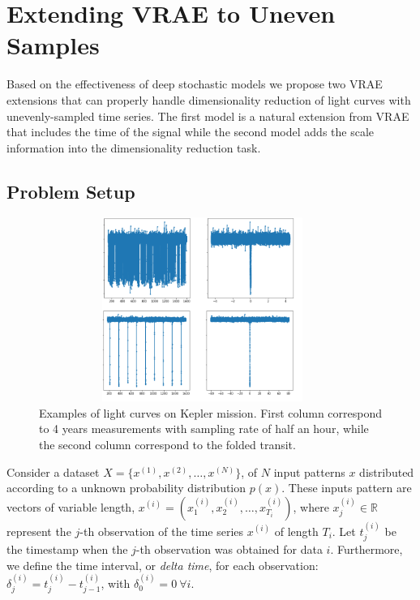 \section{Extending VRAE to Uneven Samples}
\label{proposal}

Based on the effectiveness of deep stochastic models we propose two VRAE extensions that can properly handle dimensionality reduction of light curves with unevenly-sampled time series. The first model is a natural extension from VRAE that includes the time of the signal while the second model adds the scale information into the dimensionality reduction task.

\subsection{Problem Setup}

\begin{figure}[t!]
    \centering
    \includegraphics[width=0.95\textwidth, height=6cm]{imgs/LC_ex.png}
    \caption{Examples of light curves on Kepler mission. First column correspond to 4 years measurements with sampling rate of half an hour, while the second column correspond to the folded transit.}
    \label{fig:lc_ex}
\end{figure}

Consider a dataset $X = \{x^{(1)}, x^{(2)}, \ldots, x^{(N)}\}$, of $N$ input patterns $x$ distributed according to a unknown probability distribution $p(x)$. These inputs pattern are vectors of variable length, $x^{(i)}= (x^{(i)}_1, x^{(i)}_2, \ldots, x^{(i)}_{T_i})$, where $x^{(i)}_j \in \mathbb{R}$ represent the $j$-th observation of the time series $x^{(i)}$ of length $T_i$. Let ${t}^{(i)}_j$ be the timestamp when the $j$-th observation was obtained for data $i$. Furthermore, we define the time interval, or \textit{delta time}, for each observation: $\delta^{(i)}_j = t^{(i)}_j - t^{(i)}_{j-1} $, with $\delta^{(i)}_0 = 0 \ \forall i$.


